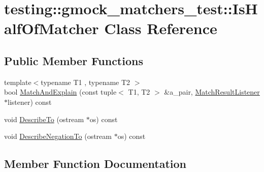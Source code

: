 \hypertarget{classtesting_1_1gmock__matchers__test_1_1_is_half_of_matcher}{}\section{testing\+:\+:gmock\+\_\+matchers\+\_\+test\+:\+:Is\+Half\+Of\+Matcher Class Reference}
\label{classtesting_1_1gmock__matchers__test_1_1_is_half_of_matcher}
\subsection*{Public Member Functions}
\begin{DoxyCompactItemize}
\item 
{\footnotesize template$<$typename T1 , typename T2 $>$ }\\bool \hyperlink{classtesting_1_1gmock__matchers__test_1_1_is_half_of_matcher_a41ccf5c44ea517c1c2aeeca852231c4d}{Match\+And\+Explain} (const tuple$<$ T1, T2 $>$ \&a\+\_\+pair, \hyperlink{classtesting_1_1_match_result_listener}{Match\+Result\+Listener} $\ast$listener) const 
\item 
void \hyperlink{classtesting_1_1gmock__matchers__test_1_1_is_half_of_matcher_a408f336da6ee31c6b17ed230b684e22d}{Describe\+To} (ostream $\ast$os) const 
\item 
void \hyperlink{classtesting_1_1gmock__matchers__test_1_1_is_half_of_matcher_ae4779c3d127d9ee348c8019020d073e8}{Describe\+Negation\+To} (ostream $\ast$os) const 
\end{DoxyCompactItemize}


\subsection{Member Function Documentation}

